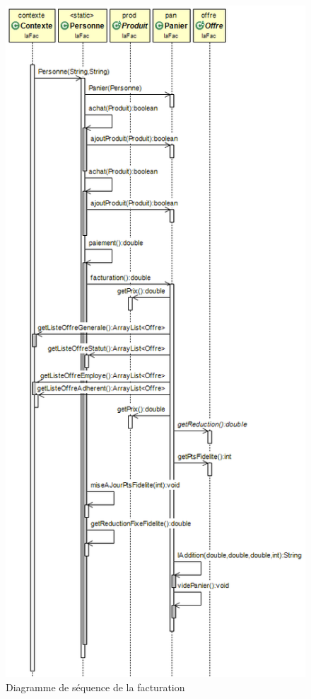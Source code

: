 \documentclass{article}
\begin{document}
\begin{figure}[ht]
	\begin{center}
		\includegraphics[scale=0.5]{ajouteProduitFactu.png}
		\caption{Diagramme de séquence de la facturation}
	\end{center}
\end{figure}
\end{document}
